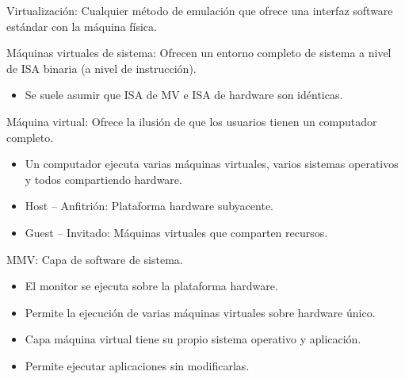 \documentclass[12pt, twoside, openright]{report} %
\begin{document}
    Virtualización: Cualquier método de emulación que ofrece una
    interfaz software estándar con la máquina física.

    Máquinas virtuales de sistema: Ofrecen un entorno completo de
    sistema a nivel de ISA binaria (a nivel de instrucción).

    \begin{itemize}
    
    \item
      Se suele asumir que ISA de MV e ISA de hardware son idénticas.
    \end{itemize}

    Máquina virtual: Ofrece la ilusión de que los usuarios tienen un
    computador completo.
    \vspace{-0.5cm}

    \begin{itemize}
    
    \item
      Un computador ejecuta varias máquinas virtuales, varios sistemas
      operativos y todos compartiendo hardware.
    \item
      Host -- Anfitrión: Plataforma hardware subyacente.
    \item
      Guest -- Invitado: Máquinas virtuales que comparten recursos.
    \end{itemize}

    MMV: Capa de software de sistema.
\vspace{-0.5cm}
    \begin{itemize}
    
    \item
      El monitor se ejecuta sobre la plataforma hardware.
    \item
      Permite la ejecución de varias máquinas virtuales sobre hardware
      único.
    \item
      Capa máquina virtual tiene su propio sistema operativo y
      aplicación.
    \item
      Permite ejecutar aplicaciones sin modificarlas.
    \end{itemize}
\end{document}
